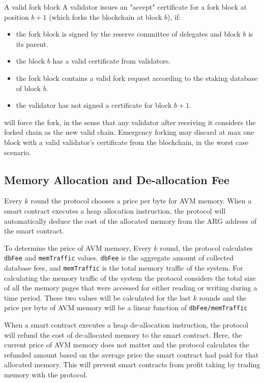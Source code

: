 A valid fork block
A validator issues
an "accept" certificate for a fork block at position $b + 1$ (which forks the blockchain at block $b$), if:
\begin{itemize}
    \item the fork block is signed by the reserve committee of delegates and block $b$ is its parent.
    \item the block $b$ has a valid certificate from validators.
    \item the fork block contains a valid fork request according to the staking database of block $b$.
    \item the validator has not signed a certificate for block $b + 1$.
\end{itemize}

will force the fork, in the sense that any validator after receiving it considers the forked chain as the new
valid chain.
Emergency forking may discard at max one block with a valid validator's certificate
from the blockchain, in the worst case scenario.



\subsection{Memory Allocation and De-allocation Fee}\label{subsec:memory-allocation-and-de-allocation}

Every $k$ round the protocol chooses a price per byte for AVM memory. When a smart contract executes a heap
allocation instruction, the protocol will automatically deduce the cost of the allocated memory from the ARG
address of the smart contract.

To determine the price of AVM memory, Every $k$ round, the protocol calculates \texttt{dbFee} and
\texttt{memTraffic} values. \texttt{dbFee} is the aggregate amount of collected database fees, and
\texttt{memTraffic} is the total memory traffic of the system. For calculating the memory traffic of the system
the protocol considers the total size of all the memory pages that were accessed for either reading or writing
during a time period. These two values will be calculated for the last $k$ rounds and the price per byte of
AVM memory will be a linear function of \texttt{dbFee/memTraffic}

When a smart contract executes a heap de-allocation instruction, the protocol will refund the cost of
de-allocated memory to the smart contract. Here, the current price of AVM memory does not matter and the protocol
calculates the refunded amount based on the average price the smart contract had paid for that allocated memory.
This will prevent smart contracts from profit taking by trading memory with the protocol.



